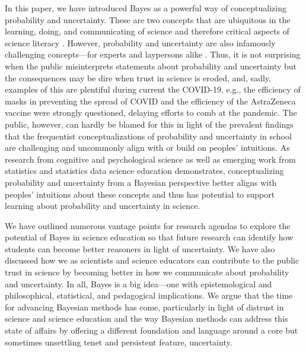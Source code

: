 \documentclass[man]{apa7}
\begin{document}
In this paper, we have introduced Bayes as a powerful way of conceptualizing probability and uncertainty. These are two concepts that are ubiquitous in the learning, doing, and communicating of science and therefore critical aspects of science literacy \parencite{}. However, probability and uncertainty are also infamously challenging concepts—for experts and laypersons alike \parencite{gkv04, s07, tk74}. Thus, it is not surprising when the public misinterprets statements about probability and uncertainty but the consequences may be dire when trust in science is eroded, and, sadly, examples of this are plentiful during current the COVID-19, e.g., the efficiency of masks in preventing the spread of COVID and the efficiency of the AstraZeneca vaccine were strongly questioned, delaying efforts to comb at the pandemic. The public, however, can hardly be blamed for this in light of the prevalent findings that the frequentist conceptualizations of probability and uncertainty in school are challenging and uncommonly align with or build on peoples’ intuitions. As research from cognitive and psychological science as well as emerging work from statistics and statistics data science education demonstrates, conceptualizing probability and uncertainty from a Bayesian perspective better aligns with peoples’ intuitions \parencite{kl18, so12} about these concepts and thus has potential to support learning about probability and uncertainty in science. 

We have outlined numerous vantage points for research agendas to explore the potential of Bayes in science education so that future research can identify how students can become better reasoners in light of uncertainty. We have also discussed how we as scientists and science educators can contribute to the public trust in science by becoming better in how we communicate about probability and uncertainty. In all, Bayes is a big idea—one with epistemological and philosophical, statistical, and pedagogical implications. We argue that the time for advancing Bayesian methods has come, particularly in light of distrust in science and science education and the way Bayesian methods can address this state of affairs by offering a different foundation and language around a core but sometimes unsettling tenet and persistent feature, uncertainty. 

\printbibliography
\end{document}
